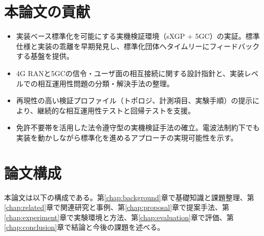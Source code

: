 \section{本論文の貢献}
\begin{itemize}
	\item 実装ベース標準化を可能にする実機検証環境（sXGP + 5GC）の実証。標準仕様と実装の乖離を早期発見し、標準化団体へタイムリーにフィードバックする基盤を提供。
	\item 4G RANと5GCの信令・ユーザ面の相互接続に関する設計指針と、実装レベルでの相互運用性問題の分類・解決手法の整理。
	\item 再現性の高い検証プロファイル（トポロジ、計測項目、実験手順）の提示により、継続的な相互運用性テストと回帰テストを支援。
	\item 免許不要帯を活用した法令遵守型の実機検証手法の確立。電波法制約下でも実装を動かしながら標準化を進めるアプローチの実現可能性を示す。
\end{itemize}

\section{論文構成}
本論文は以下の構成である。第\ref{chap:background}章で基礎知識と課題整理、第\ref{chap:related}章で関連研究と事例、第\ref{chap:proposal}章で提案手法、第\ref{chap:experiment}章で実験環境と方法、第\ref{chap:evaluation}章で評価、第\ref{chap:conclusion}章で結論と今後の課題を述べる。
